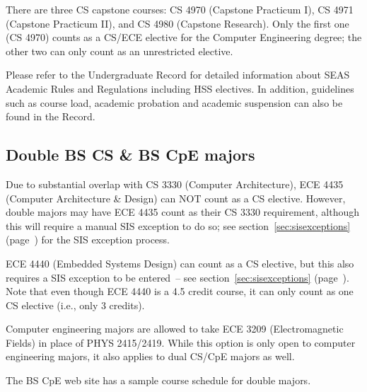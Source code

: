 
There are three CS capstone courses: CS 4970 (Capstone Practicum I), 
CS 4971 (Capstone Practicum II), and CS 4980 (Capstone Research).
Only the first one (CS 4970) counts as a CS/ECE elective for the
Computer Engineering degree; the other two can only count as an
unrestricted elective.

Please refer to the Undergraduate
Record for detailed
information about SEAS Academic Rules and Regulations including HSS
electives. In addition, guidelines such as course load, academic
probation and academic suspension can also be found in the Record.


\subsection{Double BS CS \& BS CpE majors}
\label{bscscpedoublemajors}

Due to substantial overlap with CS 3330 (Computer Architecture), ECE
4435 (Computer Architecture \& Design) can NOT count as a CS elective.
However, double majors may have ECE 4435 count as their CS 3330
requirement, although this will require a manual SIS exception to do
so; see section~\ref{sec:sisexceptions}
(page~\pageref{sec:sisexceptions}) for the SIS exception process.

ECE 4440 (Embedded Systems Design) can count as a CS elective, but
this also requires a SIS exception to be entered~-- see
section~\ref{sec:sisexceptions} (page~\pageref{sec:sisexceptions}).
Note that even though ECE 4440 is a 4.5 credit course, it can only
count as one CS elective (i.e., only 3 credits).

Computer engineering majors are allowed to take ECE 3209
(Electromagnetic Fields) in place of PHYS 2415/2419.  While this
option is only open to computer engineering majors, it also applies to
dual CS/CpE majors as well.

The BS CpE web site has a
sample course schedule for double majors.


